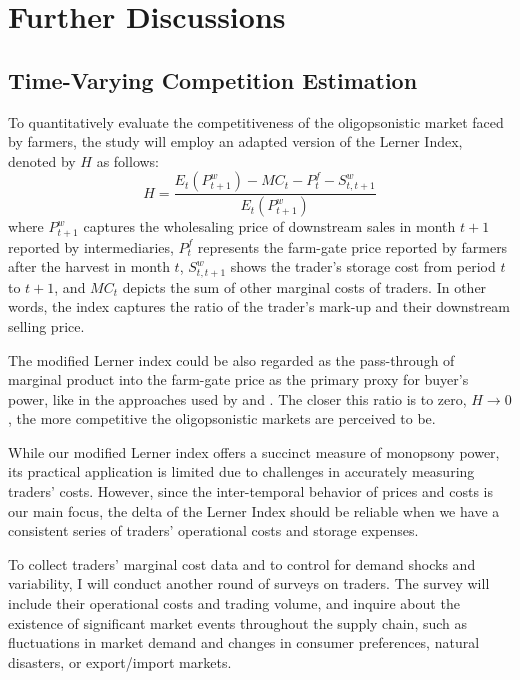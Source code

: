 \newpage
\section{Further Discussions}
\subsection{Time-Varying Competition Estimation}
\noindent To quantitatively evaluate the competitiveness of the oligopsonistic market faced by farmers, the study will employ an adapted version of the Lerner Index, denoted by $H$ as follows:
\begin{equation}
    H = \frac{E_t(P^w_{t+1}) - MC_t - P_t^f - S_{t,t+1}^w}{E_t(P^w_{t+1})}
\end{equation}
where $P^w_{t+1}$ captures the wholesaling price of downstream sales in month $t+1$ reported by intermediaries, $P_t^f$ represents the farm-gate price reported by farmers after the harvest in month $t$, $S_{t,t+1}^w$ shows the trader's storage cost from period $t$ to $t+1$, and $MC_t$ depicts the sum of other marginal costs of traders. In other words, the index captures the ratio of the trader's mark-up and their downstream selling price. 

The modified Lerner index could be also regarded as the pass-through of marginal product into the farm-gate price as the primary proxy for buyer's power, like in the approaches used by \cite{bergquist_dinerstein_2020} and \cite{atkin2015s}. The closer this ratio is to zero, $H \rightarrow 0$, the more competitive the oligopsonistic markets are perceived to be.

While our modified Lerner index offers a succinct measure of monopsony power, its practical application is limited due to challenges in accurately measuring traders' costs. However, since the inter-temporal behavior of prices and costs is our main focus, the delta of the Lerner Index should be reliable when we have a consistent series of traders' operational costs and storage expenses. 

To collect traders' marginal cost data and to control for demand shocks and variability, I will conduct another round of surveys on traders. The survey will include their operational costs and trading volume, and inquire about the existence of significant market events throughout the supply chain, such as fluctuations in market demand and changes in consumer preferences, natural disasters, or export/import markets.


